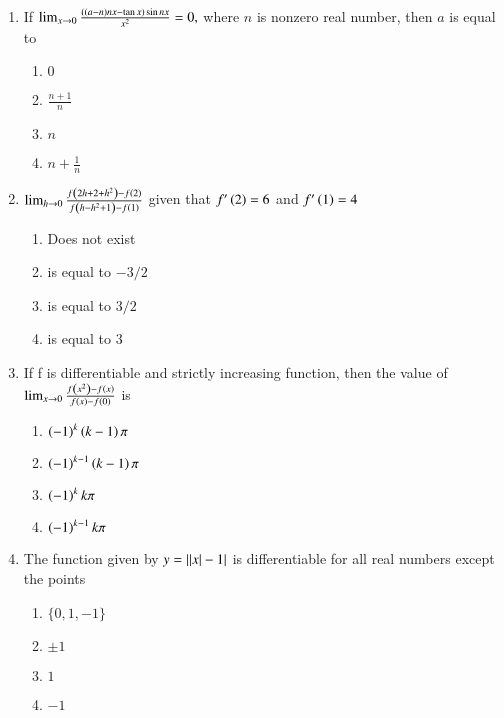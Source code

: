 \documentclass[journal,12pt,onecolumn]{IEEEtran}
\theoremstyle{remark}
\begin{document}
\begin{enumerate}
\item %

	If $\lim_{x \to 0} \frac{\left(\left(a-n\right)nx-\tan x\right)\sin nx}{x^2} =0,$ where $n$ is nonzero real number, then $a$ is equal to\hfill{}
    \begin{enumerate}
     \item $0$
     \item $\frac{n+1}{n}$
     \item $n$
     \item $n+\frac{1}{n}$\\
    \end{enumerate}


\item %

	$\lim_{h \to 0} \frac{f\left(2h+2+h^2\right)-f\left(2\right)}{f\left(h-h^2+1\right)-f\left(1\right)}$ given that $f^{\prime}\left(2\right)=6$ and $f^{\prime}\left(1\right)=4$ \hfill{}
    \begin{enumerate}
     \item Does not exist
     \item is equal to $-3/2$
     \item is equal to $3/2$
     \item is equal to $3$\\
    \end{enumerate}


\item %

	If f is differentiable and strictly increasing function, then the value of $\lim_{x \to 0} \frac{f\left(x^2\right)-f\left(x\right)}{f\left(x\right)-f\left(0\right)}$ is \hfill{}
    \begin{enumerate}
	    \item $\left(-1\right)^k \left(k-1\right) \pi$
	    \item $\left(-1\right)^{k-1} \left(k-1\right) \pi$
	    \item $\left(-1\right)^k k\pi$
            \item $\left(-1\right)^{k-1} k\pi$\\
    \end{enumerate}


\item %

	The function given by $y=\left\vert\left\vert x\right\vert-1\right\vert$ is differentiable for all real numbers except the points \hfill{}
    \begin{enumerate}
     \item $\{0,1,-1\}$
     \item $\pm 1$
     \item $1$
     \item $-1$\\
    \end{enumerate}


\end{enumerate}
\end{document}
